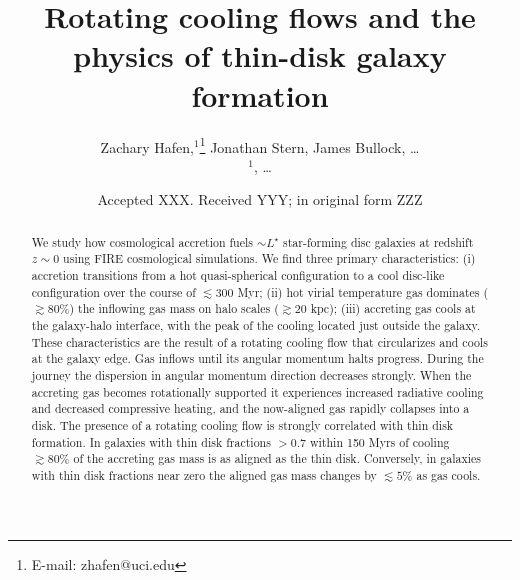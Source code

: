 \documentclass[fleqn,usenatbib]{mnras}
\title[Rotating cooling flows and thin disks]{Rotating cooling flows and the physics of thin-disk galaxy formation}
\author[Hafen, Stern, Bullock et al.]{
Zachary Hafen,$^{1}$\thanks{E-mail: zhafen@uci.edu}
Jonathan Stern,
James Bullock,
\ldots
\\
$^1$,
\ldots
}
\date{Accepted XXX. Received YYY; in original form ZZZ}
\begin{document}
\label{firstpage}
\pagerange{\pageref{firstpage}--\pageref{lastpage}}
\maketitle

\begin{abstract}
We study how cosmological accretion fuels $\sim L^\star$ star-forming disc galaxies at redshift $z\sim0$ using FIRE cosmological simulations.
We find three primary characteristics:
(i) accretion transitions from a hot quasi-spherical configuration to a cool disc-like configuration over the course of $\lesssim 300$ Myr;
(ii) hot virial temperature gas dominates ($\gtrsim80\%$) the inflowing gas mass on halo scales ($\gtrsim 20$ kpc);
(iii) accreting gas cools at the galaxy-halo interface, with the peak of the cooling located just outside the galaxy.
These characteristics are the result of a rotating cooling flow that circularizes and cools at the galaxy edge.
Gas inflows until its angular momentum halts progress.
During the journey the dispersion in angular momentum direction decreases strongly.
When the accreting gas becomes rotationally supported it experiences increased radiative cooling and decreased compressive heating, and the now-aligned gas rapidly collapses into a disk.
The presence of a rotating cooling flow is strongly correlated with thin disk formation.
In galaxies with thin disk fractions $>0.7$ within 150 Myrs of cooling $\gtrsim 80\%$ of the accreting gas mass is as aligned as the thin disk.
Conversely, in galaxies with thin disk fractions near zero the aligned gas mass changes by $\lesssim 5\%$ as gas cools.
\end{abstract}

\end{document}
